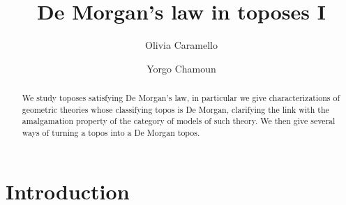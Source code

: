 \documentclass{article}
\title{De Morgan's law in toposes I}
\author{Olivia Caramello \and Yorgo Chamoun}
\begin{document}
\maketitle
\begin{abstract}
    We study toposes satisfying De Morgan's law, in particular we give characterizations of geometric theories whose classifying topos is De Morgan, clarifying the link with the amalgamation property of the category of models of such theory. We then give several ways of turning a topos into a De Morgan topos.
\end{abstract}

\tableofcontents

\section{Introduction}
\end{document}

